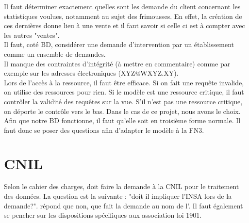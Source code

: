 \documentclass [a4paper] {article}
\begin{document}
Il faut déterminer exactement quelles sont les demande du client concernant les statistiques voulues, notamment au sujet des frimousses. En effet, la création de ces dernières donne lieu à une vente et il faut savoir si celle ci est à compter avec les autres "ventes".\\
Il faut, coté BD, considérer une demande d'intervention par un établissement comme un ensemble de demandes.\\
Il manque des contraintes d'intégrité (à mettre en commentaire) comme par exemple sur les adresses électroniques (XYZ@WXYZ.XY).\\
Lors de l'accès à la ressource, il faut être efficace. Si on fait une requête invalide, on utilise des ressources pour rien. Si le modèle est une ressource critique, il faut contrôler la validité des requêtes sur la vue. S'il n'est pas une ressource critique, on déporte le contrôle vers le bas. Dans le cas de ce projet, nous avons le choix.\\
Afin que notre BD fonctionne, il faut qu'elle soit en troisième forme normale. Il faut donc se poser des questions afin d'adapter le modèle à la FN3.

\section{CNIL}
Selon le cahier des charges, \Sergi{} doit faire la demande à la CNIL pour le traitement des données. La question est la suivante : "doit il impliquer l'INSA lors de la demande?". \nomTuteurPedago{} répond que non, que \Sergi{} fait la demande au nom de l'\nomClient{}. Il faut également se pencher sur les dispositions spécifiques aux association loi 1901.


\newpage
\end{document}
